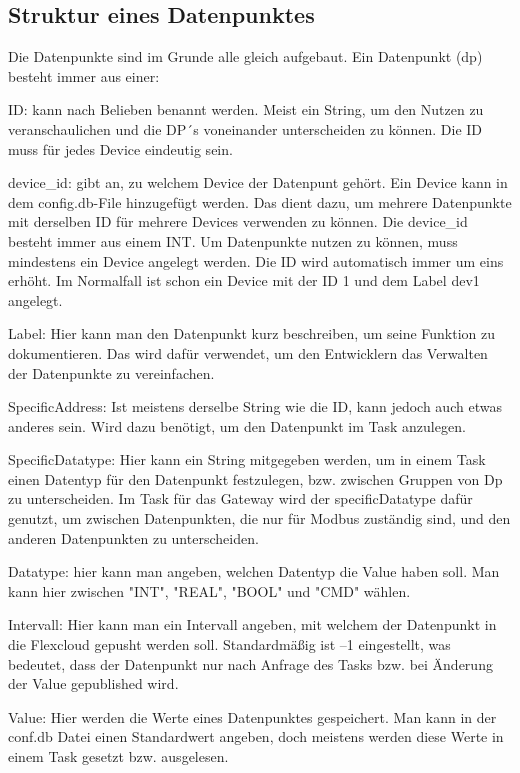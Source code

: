 \subsection{Struktur eines Datenpunktes}\label{Datenpunkte}

Die Datenpunkte sind im Grunde alle gleich aufgebaut. Ein Datenpunkt (dp) besteht immer aus einer: 

\begin{compactitem}
    \item ID: kann nach Belieben benannt werden. Meist ein String, um den Nutzen zu veranschaulichen und die DP´s voneinander unterscheiden zu können. Die ID muss für jedes Device eindeutig sein.
    \item device\_id: gibt an, zu welchem Device der Datenpunt gehört. Ein Device kann in dem config.db-File hinzugefügt werden. Das dient dazu, um mehrere Datenpunkte mit derselben ID für mehrere Devices verwenden zu können. Die device\_id besteht immer aus einem INT. Um Datenpunkte nutzen zu können, muss mindestens ein Device angelegt werden. Die ID wird automatisch immer um eins erhöht. Im Normalfall ist schon ein Device mit der ID 1 und dem Label dev1 angelegt.
    \item Label: Hier kann man den Datenpunkt kurz beschreiben, um seine Funktion zu dokumentieren. Das wird dafür verwendet, um den Entwicklern das Verwalten der Datenpunkte zu vereinfachen.
    \item SpecificAddress: Ist meistens derselbe String wie die ID, kann jedoch auch etwas anderes sein. Wird dazu benötigt, um den Datenpunkt im Task anzulegen.
    \item SpecificDatatype: Hier kann ein String mitgegeben werden, um in einem Task einen Datentyp für den Datenpunkt festzulegen, bzw. zwischen Gruppen von Dp zu unterscheiden. Im Task für das Gateway wird der specificDatatype dafür genutzt, um zwischen Datenpunkten, die nur für Modbus zuständig sind, und den anderen Datenpunkten zu unterscheiden.
    \item Datatype: hier kann man angeben, welchen Datentyp die Value haben soll. Man kann hier zwischen "INT", "REAL", "BOOL" und "CMD" wählen.
    \item Intervall: Hier kann man ein Intervall angeben, mit welchem der Datenpunkt in die Flexcloud gepusht werden soll. Standardmäßig ist –1 eingestellt, was bedeutet, dass der Datenpunkt nur nach Anfrage des Tasks bzw. bei Änderung der Value gepublished wird.
    \item Value: Hier werden die Werte eines Datenpunktes gespeichert. Man kann in der conf.db Datei einen Standardwert angeben, doch meistens werden diese Werte in einem Task gesetzt bzw. ausgelesen. 
\end{compactitem}

